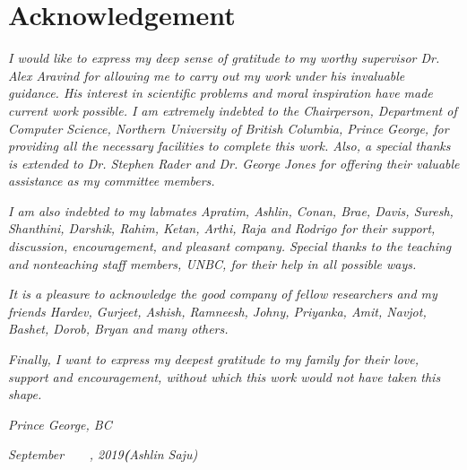 \documentclass[a4paper,12pt,titlepage,oneside]{report}
\begin{document}
\section*{Acknowledgement}
{\large
\emph{I would like to express my deep sense of gratitude to my worthy supervisor Dr. Alex Aravind for allowing me to carry out my work under his invaluable guidance. His interest in scientific problems and moral inspiration have made current work possible. I am extremely indebted to the Chairperson, Department of Computer Science, Northern University of British Columbia, Prince George, for providing all the necessary facilities to complete this work. Also, a special thanks is extended to Dr. Stephen Rader and Dr. George Jones for offering their valuable assistance as my committee members.}

\emph{I am also indebted to my labmates Apratim, Ashlin, Conan, Brae, Davis, Suresh, Shanthini, Darshik, Rahim, Ketan, Arthi, Raja and Rodrigo for their support, discussion, encouragement, and pleasant company. Special thanks to the teaching and nonteaching staff members, UNBC, for their help in all possible ways.}
\par
\emph{It is a pleasure to acknowledge the good company of fellow researchers and my friends Hardev, Gurjeet, Ashish, Ramneesh, Johny, Priyanka, Amit, Navjot, Bashet, Dorob, Bryan and many others.}

\emph{Finally, I want to express my deepest gratitude to my family for their love, support and encouragement, without which this work would not have taken this shape.}

\vspace{1.0cm}
\emph{Prince George, BC}

\emph{September~~~~, 2019\hfill\textbf(Ashlin Saju)}



}
\end{document}
